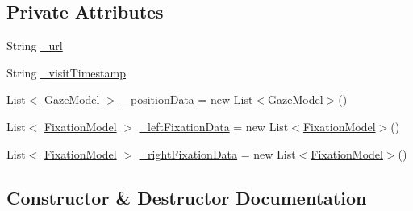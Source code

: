 \subsection*{Private Attributes}
\begin{DoxyCompactItemize}
\item 
String \hyperlink{class_web_analyzer_1_1_models_1_1_data_model_1_1_webpage_model_aea93808218833baaf68514071c973ae4}{\+\_\+url}
\item 
String \hyperlink{class_web_analyzer_1_1_models_1_1_data_model_1_1_webpage_model_ac030b9fb9430a41677eb845ceabd5b26}{\+\_\+visit\+Timestamp}
\item 
List$<$ \hyperlink{class_web_analyzer_1_1_models_1_1_data_model_1_1_gaze_model}{Gaze\+Model} $>$ \hyperlink{class_web_analyzer_1_1_models_1_1_data_model_1_1_webpage_model_a1830061eb9c3046a86386306ac467f25}{\+\_\+position\+Data} = new List$<$\hyperlink{class_web_analyzer_1_1_models_1_1_data_model_1_1_gaze_model}{Gaze\+Model}$>$()
\item 
List$<$ \hyperlink{class_web_analyzer_1_1_models_1_1_analysis_model_1_1_fixation_model}{Fixation\+Model} $>$ \hyperlink{class_web_analyzer_1_1_models_1_1_data_model_1_1_webpage_model_aeef627527c26ccf4d8caa6e65101970f}{\+\_\+left\+Fixation\+Data} = new List$<$\hyperlink{class_web_analyzer_1_1_models_1_1_analysis_model_1_1_fixation_model}{Fixation\+Model}$>$()
\item 
List$<$ \hyperlink{class_web_analyzer_1_1_models_1_1_analysis_model_1_1_fixation_model}{Fixation\+Model} $>$ \hyperlink{class_web_analyzer_1_1_models_1_1_data_model_1_1_webpage_model_a5c341d7a7fd5074ddbd4cb7622914465}{\+\_\+right\+Fixation\+Data} = new List$<$\hyperlink{class_web_analyzer_1_1_models_1_1_analysis_model_1_1_fixation_model}{Fixation\+Model}$>$()
\end{DoxyCompactItemize}


\subsection{Constructor \& Destructor Documentation}
\hypertarget{class_web_analyzer_1_1_models_1_1_data_model_1_1_webpage_model_ae5054b6875654937144914f592802d9d}{}
